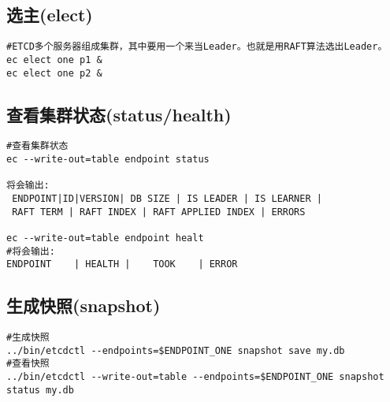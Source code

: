 \subsection{选主(elect)}
\begin{verbatim}
#ETCD多个服务器组成集群，其中要用一个来当Leader。也就是用RAFT算法选出Leader。
ec elect one p1 &
ec elect one p2 &
\end{verbatim}

\subsection{查看集群状态(status/health)}
\begin{verbatim}
#查看集群状态
ec --write-out=table endpoint status

将会输出:
 ENDPOINT|ID|VERSION| DB SIZE | IS LEADER | IS LEARNER | 
 RAFT TERM | RAFT INDEX | RAFT APPLIED INDEX | ERRORS 
 
ec --write-out=table endpoint healt
#将会输出:
ENDPOINT    | HEALTH |    TOOK    | ERROR
\end{verbatim}

\subsection{生成快照(snapshot)}
\begin{verbatim}
#生成快照
../bin/etcdctl --endpoints=$ENDPOINT_ONE snapshot save my.db
#查看快照
../bin/etcdctl --write-out=table --endpoints=$ENDPOINT_ONE snapshot status my.db
\end{verbatim}

